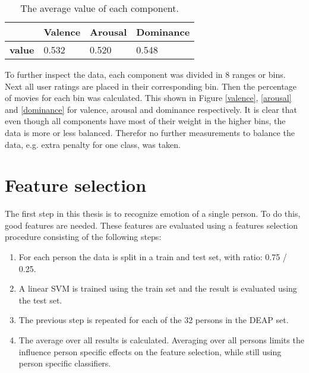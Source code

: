 \begin{table}[H]
\centering
\begin{tabular}{l|lll}
\textbf{}  & \textbf{Valence} & \textbf{Arousal} & \textbf{Dominance} \\ \hline
\textbf{value} & 0.532     	  & 0.520  			 & 0.548
\end{tabular}
\caption{The average value of each component.\label{avg-vals}}
\end{table}

To further inspect the data, each component was divided in 8 ranges or bins. Next all user ratings are placed in their corresponding bin. Then the percentage of movies for each bin was calculated. This shown in Figure \ref{valence}, \ref{arousal} and \ref{dominance} for valence, arousal and dominance respectively. It is clear that even though all components have most of their weight in the higher bins, the data is more or less balanced. Therefor no further measurements to balance the data, e.g. extra penalty for one class, was taken.


\section{Feature selection}

The first step in this thesis is to recognize emotion of a single person. To do this, good features are needed. These features are evaluated using a features selection procedure consisting of the following steps:
\begin{enumerate}
\item For each person the data is split in a train and test set, with ratio: 0.75 / 0.25.
\item A linear SVM is trained using the train set and the result is evaluated using the test set. 
\item The previous step is repeated for each of the 32 persons in the DEAP set.
\item The average over all results is calculated. Averaging over all persons limits the influence person specific effects on the feature selection, while still using person specific classifiers.
\end{enumerate}

